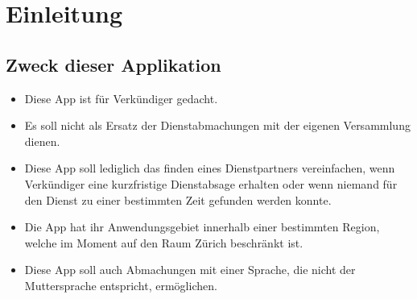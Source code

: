 \section{Einleitung}

\subsection{Zweck dieser Applikation}
\begin{itemize}
\item Diese App ist für Verkündiger gedacht.
\item Es soll nicht als Ersatz der Dienstabmachungen mit der eigenen Versammlung dienen.
\item Diese App soll lediglich das finden eines Dienstpartners vereinfachen, wenn Verkündiger eine kurzfristige Dienstabsage erhalten oder wenn niemand für den Dienst zu einer bestimmten Zeit gefunden werden konnte.
\item Die App hat ihr Anwendungsgebiet innerhalb einer bestimmten Region, welche im Moment auf den Raum Zürich beschränkt ist.
\item Diese App soll auch Abmachungen mit einer Sprache, die nicht der Muttersprache entspricht, ermöglichen.
\end{itemize}
